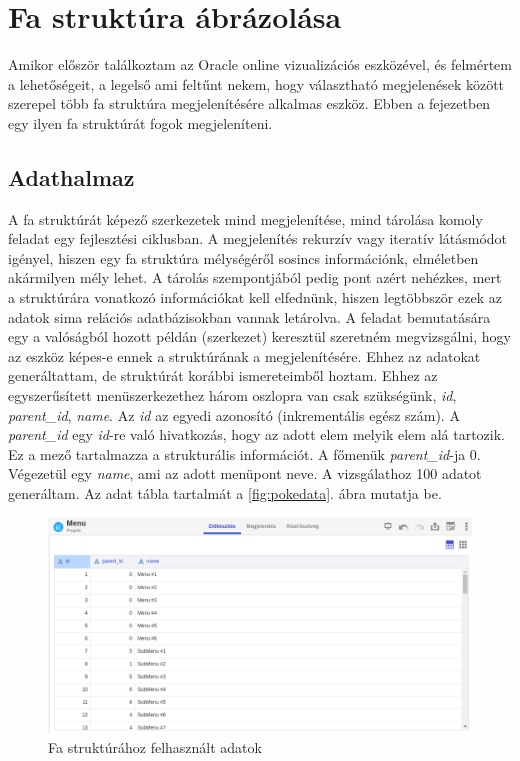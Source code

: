 \section{Fa struktúra ábrázolása}
	Amikor először találkoztam az Oracle online vizualizációs eszközével, és felmértem a lehetőségeit, a legelső ami feltűnt nekem, hogy választható megjelenések között szerepel több fa struktúra megjelenítésére alkalmas eszköz. Ebben a fejezetben egy ilyen fa struktúrát fogok megjeleníteni.
	
	\subsection{Adathalmaz}
	A fa struktúrát képező szerkezetek mind megjelenítése, mind tárolása komoly feladat egy fejlesztési ciklusban. A megjelenítés rekurzív vagy iteratív látásmódot igényel, hiszen egy fa struktúra mélységéről sosincs információnk, elméletben akármilyen mély lehet. A tárolás szempontjából pedig pont azért nehézkes, mert a struktúrára vonatkozó információkat kell elfednünk, hiszen legtöbbször ezek az adatok sima relációs adatbázisokban vannak letárolva. A feladat bemutatására egy a valóságból hozott példán (szerkezet) keresztül szeretném megvizsgálni, hogy az eszköz képes-e ennek a struktúrának a megjelenítésére. Ehhez az adatokat generáltattam, de struktúrát korábbi ismereteimből hoztam. Ehhez az egyszerűsített menüszerkezethez három oszlopra van csak szükségünk, \textit{id}, \textit{parent\_id}, \textit{name}. Az \textit{id} az egyedi azonosító (inkrementális egész szám). A \textit{parent\_id} egy \textit{id}-re való hivatkozás, hogy az adott elem melyik elem alá tartozik. Ez a mező tartalmazza a strukturális információt. A főmenük \textit{parent\_id}-ja 0. Végezetül egy \textit{name}, ami az adott menüpont neve. A vizsgálathoz 100 adatot generáltam. Az adat tábla tartalmát a \ref{fig:pokedata}. ábra mutatja be.
	
	\begin{figure}[h!]
		\centering
		\includegraphics[width=1.0\linewidth]{keve_imgs/adat}
		\caption{Fa struktúrához felhasznált adatok}
		\label{fig:faadat}
	\end{figure}
	
